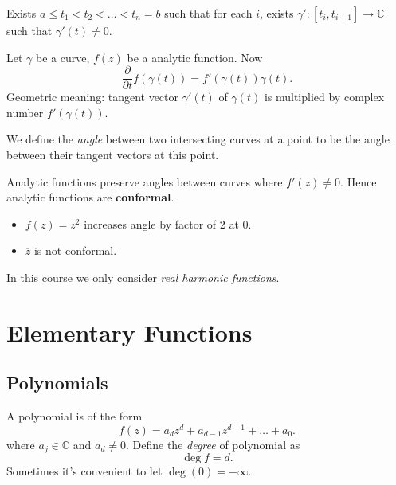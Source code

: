 \begin{definition}
	Exists $a\le t_1<t_2<\ldots<t_n = b$ such that for each $i$, exists $\gamma': [t_i, t_{i+1}] \to \mathbb{C}$ such that $\gamma'(t) \neq 0$.
\end{definition}



Let $\gamma$ be a curve, $f(z)$ be a analytic function. Now \[
	\frac{\partial }{\partial t} f(\gamma(t)) = f'(\gamma(t))\gamma(t)
.\] 
Geometric meaning: tangent vector $\gamma'(t)$ of $\gamma(t)$ is multiplied by complex number $f'(\gamma(t))$.

\begin{definition}
We define the \textit{angle} between two intersecting curves at a point to be the angle between their tangent vectors at this point.
\end{definition}

\begin{theorem}
	Analytic functions preserve angles between curves where $f'(z) \neq  0$. Hence analytic functions are \textbf{conformal}.
\end{theorem}

\begin{nonexample}
	\begin{itemize}
		\item 
	$f(z) = z^2$ increases angle by factor of $2$ at $0$.
\item $\overline{z}$ is not conformal.
	\end{itemize}
\end{nonexample}

\begin{remark}
	In this course we only consider \textit{real harmonic functions}.

\end{remark}
\section{Elementary Functions}

\subsection{Polynomials}

\begin{definition}
	A polynomial is of the form \[
		f(z) = a_d z^d + a_{d-1} z^{d-1} + \ldots+a_0
	.\] where $a_j \in \mathbb{C}$ and $a_d \neq  0$.
	Define the \textit{degree} of polynomial as \[
		\operatorname{deg} f = d
	.\] 
	Sometimes it's convenient to let $\operatorname{deg} (0) = -\infty $.
\end{definition}

